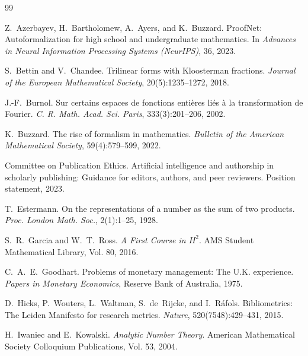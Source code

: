 \documentclass[11pt,a4paper]{article}
\theoremstyle{definition}
\theoremstyle{remark}
\begin{document}
\begin{thebibliography}{99}

Z.~Azerbayev, H.~Bartholomew, A.~Ayers, and K.~Buzzard.
\newblock Proof{N}et: Autoformalization for high school and undergraduate mathematics.
\newblock In \emph{Advances in Neural Information Processing Systems (NeurIPS)}, 36, 2023.

S.~Bettin and V.~Chandee.
\newblock Trilinear forms with {K}loosterman fractions.
\newblock \emph{Journal of the European Mathematical Society}, 20(5):1235--1272, 2018.

J.-F.~Burnol.
\newblock Sur certains espaces de fonctions enti\`eres li\'es \`a la transformation de {F}ourier.
\newblock \emph{C. R. Math. Acad. Sci. Paris}, 333(3):201--206, 2002.

K.~Buzzard.
\newblock The rise of formalism in mathematics.
\newblock \emph{Bulletin of the American Mathematical Society}, 59(4):579--599, 2022.

Committee on Publication Ethics.
\newblock Artificial intelligence and authorship in scholarly publishing: Guidance for editors, authors, and peer reviewers.
\newblock Position statement, 2023.

T.~Estermann.
\newblock On the representations of a number as the sum of two products.
\newblock \emph{Proc. London Math. Soc.}, 2(1):1--25, 1928.

S.~R.~Garcia and W.~T.~Ross.
\newblock \emph{A First Course in $H^2$}.
\newblock AMS Student Mathematical Library, Vol. 80, 2016.

C.~A.~E.~Goodhart.
\newblock Problems of monetary management: The {U.K.} experience.
\newblock \emph{Papers in Monetary Economics}, Reserve Bank of Australia, 1975.

D.~Hicks, P.~Wouters, L.~Waltman, S.~de~Rijcke, and I.~R\'afols.
\newblock Bibliometrics: The {L}eiden {M}anifesto for research metrics.
\newblock \emph{Nature}, 520(7548):429--431, 2015.

H.~Iwaniec and E.~Kowalski.
\newblock \emph{Analytic Number Theory}.
\newblock American Mathematical Society Colloquium Publications, Vol. 53, 2004.


\end{thebibliography}
\end{document}
